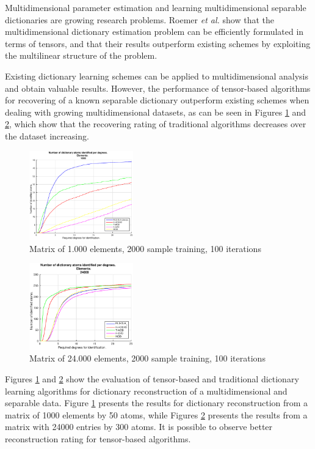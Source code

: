 Multidimensional parameter estimation and learning multidimensional separable dictionaries are growing research problems. Roemer \emph{et al.} \cite{roemer2014tensor} show that the multidimensional dictionary estimation problem can be efficiently formulated in terms of tensors, and that their results outperform existing schemes by exploiting the multilinear structure of the problem.

Existing dictionary learning schemes can be applied to multidimensional analysis and obtain valuable results. However, the performance of tensor-based algorithms for recovering of a known separable dictionary outperform existing schemes when dealing with growing multidimensional datasets, as can be seen in Figures \ref{fig:fig1} and \ref{fig:fig2}, which show that the recovering rating of traditional algorithms decreases over the dataset increasing.

\begin{figure}[!htb]
     \centering 
	 \includegraphics[width=0.4\textwidth]{figures/5_20_2000_1000_100.eps}
     \caption{Matrix of 1.000 elements, 2000 sample training, 100 iterations}
     \label{fig:fig1}
\end{figure}

\begin{figure}[!htb]
     \centering 
	 \includegraphics[width=0.4\textwidth]{figures/5_20_2000_24000_100.eps}
     \caption{Matrix of 24.000 elements, 2000 sample training, 100 iterations}
     \label{fig:fig2}
\end{figure}

Figures \ref{fig:fig1} and \ref{fig:fig2} show the evaluation of tensor-based and traditional dictionary learning algorithms for dictionary reconstruction of a multidimensional and separable data. Figure \ref{fig:fig1} presents the results for dictionary reconstruction from a matrix of 1000 elements by 50 atoms, while Figures \ref{fig:fig2} presents the results from a matrix with 24000 entries by 300 atoms. It is possible to observe better reconstruction rating for tensor-based algorithms. 

